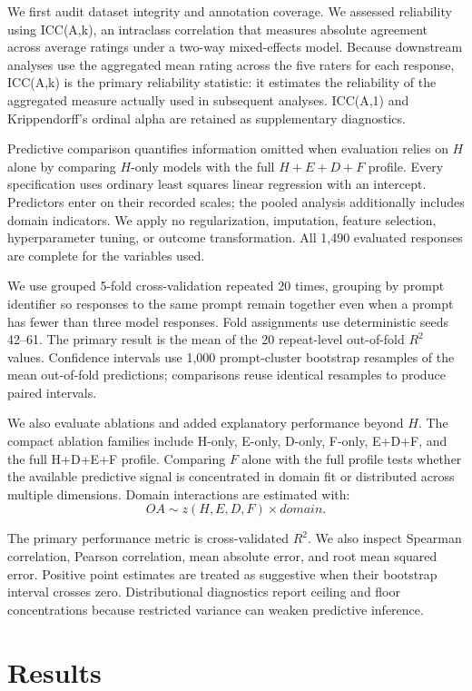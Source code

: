 \documentclass[manuscript,review,anonymous]{acmart}
\begin{document}
We first audit dataset integrity and annotation coverage. We assessed reliability using ICC(A,k), an intraclass correlation that measures absolute agreement across average ratings under a two-way mixed-effects model. Because downstream analyses use the aggregated mean rating across the five raters for each response, ICC(A,k) is the primary reliability statistic: it estimates the reliability of the aggregated measure actually used in subsequent analyses. ICC(A,1) and Krippendorff's ordinal alpha are retained as supplementary diagnostics.

Predictive comparison quantifies information omitted when evaluation relies on $H$ alone by comparing $H$-only models with the full $H+E+D+F$ profile. Every specification uses ordinary least squares linear regression with an intercept. Predictors enter on their recorded scales; the pooled analysis additionally includes domain indicators. We apply no regularization, imputation, feature selection, hyperparameter tuning, or outcome transformation. All 1,490 evaluated responses are complete for the variables used.

We use grouped 5-fold cross-validation repeated 20 times, grouping by prompt identifier so responses to the same prompt remain together even when a prompt has fewer than three model responses. Fold assignments use deterministic seeds 42--61. The primary result is the mean of the 20 repeat-level out-of-fold $R^2$ values. Confidence intervals use 1,000 prompt-cluster bootstrap resamples of the mean out-of-fold predictions; comparisons reuse identical resamples to produce paired intervals.

We also evaluate ablations and added explanatory performance beyond $H$. The compact ablation families include H-only, E-only, D-only, F-only, E+D+F, and the full H+D+E+F profile. Comparing $F$ alone with the full profile tests whether the available predictive signal is concentrated in domain fit or distributed across multiple dimensions. Domain interactions are estimated with:
\[
OA \sim z(H,E,D,F)\times domain.
\]

The primary performance metric is cross-validated $R^2$. We also inspect Spearman correlation, Pearson correlation, mean absolute error, and root mean squared error. Positive point estimates are treated as suggestive when their bootstrap interval crosses zero. Distributional diagnostics report ceiling and floor concentrations because restricted variance can weaken predictive inference.

\section{Results}
\end{document}
